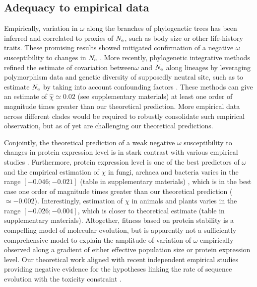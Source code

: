 \documentclass{MBE}%
\begin{document}
\subsection*{Adequacy to empirical data}
Empirically, variation in $\omega$ along the branches of phylogenetic trees has been inferred and correlated to proxies of $N_{\mathrm{e}}$, such as body size or other life-history traits.
These promising results showed mitigated confirmation of a negative $\omega$ susceptibility to changes in $N_{\mathrm{e}}$ \citep{Lanfear2014}.
More recently, phylogenetic integrative methods refined the estimate of covariation between$\omega$ and $N_{\mathrm{e}}$ along lineages by leveraging polymorphism data and genetic diversity of supposedly neutral site, such as to estimate $N_{\mathrm{e}}$ by taking into account confounding factors \citep{Brevet2019}.
These methods can give an estimate of $\hat{\chi} \simeq 0.02$ (see supplementary materials) at least one order of magnitude times greater than our theoretical prediction.
More empirical data across different clades would be required to robustly consolidate such empirical observation, but as of yet are challenging our theoretical predictions.

Conjointly, the theoretical prediction of a weak negative $\omega$ susceptibility to changes in protein expression level is in stark contrast with various empirical studies \citep{Duret2000, Rocha2004, Wang2011, Song2017}.
Furthermore, protein expression level is one of the best predictors of $\omega$ and the empirical estimation of $\chi$ in fungi, archaea and bacteria varies in the range $[-0.046;-0.021]$ (table in supplementary materials) \citep{Zhang2015}, which is in the best case one order of magnitude times greater than our theoretical prediction ($\simeq -0.002$).
Interestingly, estimation of $\chi$ in animals and plants varies in the range $[-0.026;-0.004]$, which is closer to theoretical estimate (table in supplementary materials). Altogether, fitness based on protein stability is a compelling model of molecular evolution, but is apparently not a sufficiently comprehensive model to explain the amplitude of variation of $\omega$ empirically observed along a gradient of either effective population size or protein expression level.
Our theoretical work aligned with recent independent empirical studies providing negative evidence for the hypotheses linking the rate of sequence evolution with the toxicity constraint \citep{Plata2017, Biesiadecka2020}.
\end{document}
